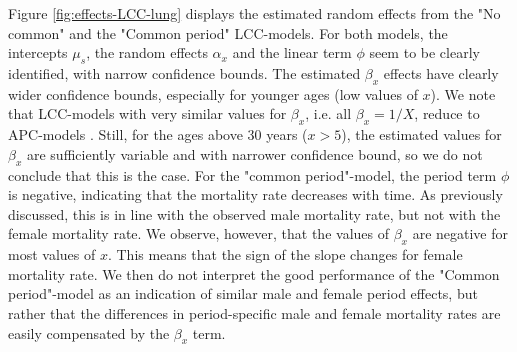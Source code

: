 \newpar Figure \ref{fig:effects-LCC-lung} displays the estimated random effects from the "No common" and the "Common period" LCC-models. For both models, the intercepts $\mu_s$, the random effects $\alpha_x$ and the linear term $\phi$ seem to be clearly identified, with narrow confidence bounds. The estimated $\beta_x$ effects have clearly wider confidence bounds, especially for younger ages (low values of $x$). We note that LCC-models with very similar values for $\beta_x$, i.e. all $\beta_x = 1/X$, reduce to APC-models \parencite{Wisniowski2015}. Still, for the ages above 30 years ($x > 5$), the estimated values for $\beta_x$ are sufficiently variable and with narrower confidence bound, so we do not conclude that this is the case. For the "common period"-model, the period term $\phi$ is negative, indicating that the mortality rate decreases with time. As previously discussed, this is in line with the observed male mortality rate, but not with the female mortality rate. We observe, however, that the values of $\beta_x$ are negative for most values of $x$. This means that the sign of the slope changes for female mortality rate. We then do not interpret the good performance of the "Common period"-model as an indication of similar male and female period effects, but rather that the differences in period-specific male and female mortality rates are easily compensated by the $\beta_x$ term. 

